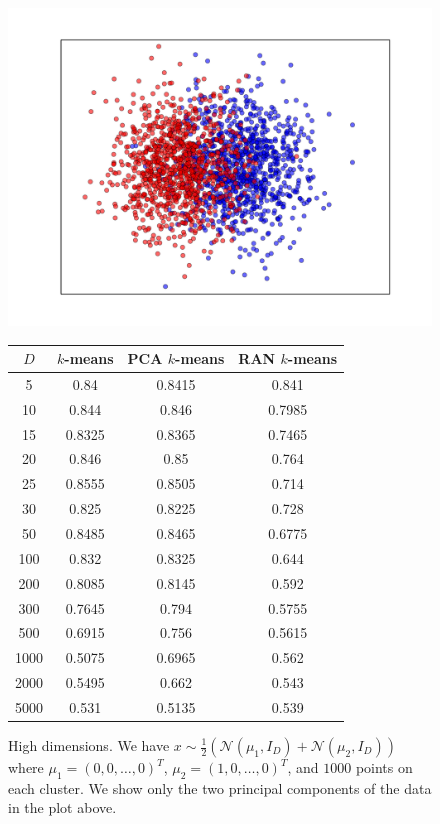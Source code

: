 \documentclass[aps,preprint,nofootinbib,floatfix]{revtex4-1}
\begin{document}
\begin{figure}
\begin{minipage}{.49\textwidth}
\includegraphics[scale=.45]{30d_gauss.pdf}
\end{minipage}
\begin{minipage}{.49\textwidth}
\renewcommand*{\arraystretch}{.3}
\begin{tabular}{ c | c | c | c }
~$D$~ & $k$-means & PCA $k$-means & RAN $k$-means \\
\hline
5 & 0.84 & 0.8415 & 0.841 \\
10 & 0.844 & 0.846 & 0.7985 \\
15 & 0.8325 & 0.8365 & 0.7465 \\
20 & 0.846 & 0.85 & 0.764 \\
25 & 0.8555 & 0.8505 & 0.714 \\
30 & 0.825 & 0.8225 & 0.728 \\
50 & 0.8485 & 0.8465 & 0.6775 \\
100 & 0.832 & 0.8325 & 0.644 \\
200 & 0.8085 & 0.8145 & 0.592 \\
300 & 0.7645 & 0.794 & 0.5755 \\
500 & 0.6915 & 0.756 & 0.5615 \\
1000 & 0.5075 & 0.6965 & 0.562 \\
2000 & 0.5495 & 0.662 & 0.543 \\
5000 & 0.531 & 0.5135 & 0.539 \\
\hline
\end{tabular}
\end{minipage}
\caption{\label{fig:2d_gauss_sep}
High dimensions.
We have $x \sim \tfrac{1}{2}\left( \mathcal{N}(\mu_1, I_D) +
\mathcal{N}(\mu_2, I_D)\right)$ where $\mu_1 = (0,0,\dotsc,0)^T$,
$\mu_2=(1,0,\dots,0)^T$,
and $1000$ points on each cluster. We show only the two principal components
of the data in the plot above.
}
\end{figure}
\end{document}
